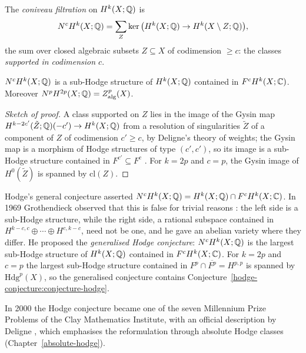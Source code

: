 \begin{definition}\label{hodge-conjecture:definition-coniveau}
The \emph{coniveau filtration} on $H^k(X; \mathbb{Q})$ is
\[
N^cH^k(X; \mathbb{Q}) = \sum_Z\ker\big(H^k(X; \mathbb{Q}) \to H^k(X \setminus Z; \mathbb{Q})\big),
\]
the sum over closed algebraic subsets $Z \subseteq X$ of codimension $\geq c$: the classes \emph{supported in codimension $c$}.
\end{definition}

\begin{proposition}\label{hodge-conjecture:proposition-coniveau}
$N^cH^k(X; \mathbb{Q})$ is a sub-Hodge structure of $H^k(X; \mathbb{Q})$ contained in $F^cH^k(X; \mathbb{C})$. Moreover $N^pH^{2p}(X; \mathbb{Q}) = Z^p_{\mathrm{alg}}(X)$.
\end{proposition}

\begin{proof}[Sketch of proof]
A class supported on $Z$ lies in the image of the Gysin map $H^{k-2c'}(\tilde Z; \mathbb{Q})(-c') \to H^k(X; \mathbb{Q})$ from a resolution of singularities $\tilde Z$ of a component of $Z$ of codimension
$c' \geq c$, by Deligne's theory of weights; the Gysin map is a morphism of Hodge structures of type $(c', c')$, so its image
is a sub-Hodge structure contained in $F^{c'} \subseteq F^c$ \cite{deligne-hodge-2}. For $k = 2p$ and $c = p$, the Gysin image of $H^0(\tilde Z)$ is spanned by $\mathrm{cl}(Z)$.
\end{proof}

\begin{remark}\label{hodge-conjecture:remark-grothendieck}
Hodge's general conjecture asserted $N^cH^k(X; \mathbb{Q}) = H^k(X; \mathbb{Q}) \cap F^cH^k(X; \mathbb{C})$. In 1969 Grothendieck observed that this is false for trivial reasons \cite{grothendieck-1969}: the left side is a
sub-Hodge structure, while the right side, a rational subspace contained in $H^{k-c,c} \oplus \cdots \oplus H^{c,k-c}$, need not be one, and he gave an abelian variety where they differ. He
proposed the \emph{generalised Hodge conjecture}: $N^cH^k(X; \mathbb{Q})$ is the largest sub-Hodge structure of $H^k(X; \mathbb{Q})$ contained in $F^cH^k(X; \mathbb{C})$. For $k = 2p$ and $c = p$ the largest
sub-Hodge structure contained in $F^p \cap \overline{F^p} = H^{p,p}$ is spanned by $\mathrm{Hdg}^p(X)$, so the generalised conjecture contains Conjecture~\ref{hodge-conjecture:conjecture-hodge}.
\end{remark}

\begin{remark}\label{hodge-conjecture:remark-clay}
In 2000 the Hodge conjecture became one of the seven Millennium Prize Problems of the Clay Mathematics Institute, with an official description by Deligne \cite{deligne-clay}, which emphasises
the reformulation through absolute Hodge classes (Chapter~\ref{absolute-hodge}).
\end{remark}

